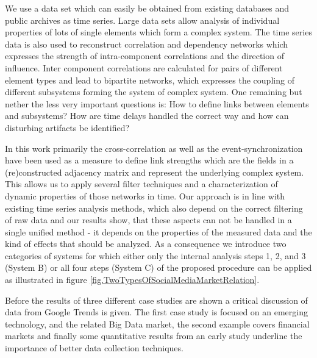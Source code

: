 \documentclass[a4paper,10pt]{scrbook}
\begin{document}
\label{ext.fig.TwoTypesOfSocialMediaMarketRelation}


We use a data set which can easily be obtained from existing databases and public archives as time series. Large data sets allow analysis of individual properties of lots of single elements which form a complex system. The time series data is also used to reconstruct correlation and dependency networks which expresses the strength of intra-component correlations and the direction of influence. Inter component correlations are calculated for pairs of different element types and lead to bipartite networks, which expresses the coupling of different subsystems forming the system of complex system. One remaining but nether the less very important questions is: How to define links between elements and subsystems? How are time delays handled the correct way and how can disturbing artifacts be identified? 

In this work primarily the cross-correlation as well as the event-synchronization have been used as a measure to define link strengths which are the fields in a (re)constructed adjacency matrix and represent the underlying complex system. This allows us to apply several filter techniques and a characterization of dynamic properties of those networks in time. Our approach is in line with existing time series analysis methods, which also depend on the correct filtering of raw data and our results show, that these aspects can not be handled in a single unified method - it depends on the properties of the measured data and the kind of effects that should be analyzed. As a consequence we introduce two categories of systems for which either only the internal analysis steps 1, 2, and 3 (System B) or all four steps (System C) of the proposed procedure can be applied as illustrated in figure \ref{fig.TwoTypesOfSocialMediaMarketRelation}.

Before the results of three different case studies are shown a critical discussion of data from Google Trends is given. The first case study is focused on an emerging technology, and the related Big Data market, the second example covers financial markets and finally some quantitative results from an early study underline the importance of better data collection techniques. 

\newpage
\end{document}
